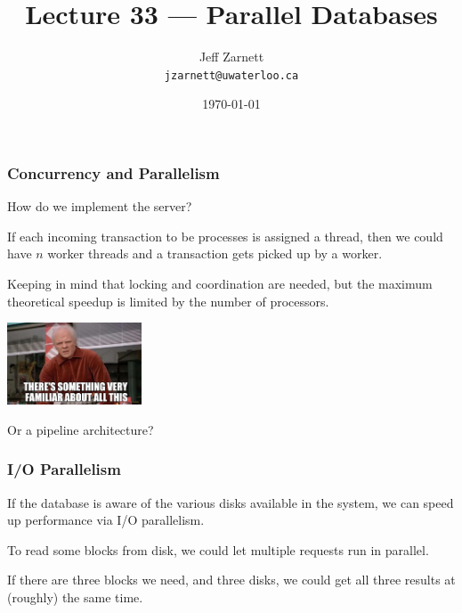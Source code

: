 

\title{Lecture 33 --- Parallel Databases }

\author{Jeff Zarnett \\ \small \texttt{jzarnett@uwaterloo.ca}}
\date{\today}




\begin{frame}
  \titlepage

 \end{frame}
 
 

\begin{frame}
\frametitle{Concurrency and Parallelism}

How do we implement the server?

If each incoming transaction to be processes is assigned a thread, then we could have $n$ worker threads and a transaction gets picked up by a worker. 

Keeping in mind that locking and coordination are needed, but the maximum theoretical speedup is limited by the number of processors.

\begin{center}
	\includegraphics[width=0.3\textwidth]{images/familiar.jpg}
\end{center}


Or a pipeline architecture?
\end{frame}
 
 


\begin{frame}
\frametitle{I/O Parallelism}

If the database is aware of the various disks available in the system, we can speed up performance via I/O parallelism. 

To read some blocks from disk, we could let multiple requests run in parallel. 

If there are three blocks we need, and three disks, we could get all three results at (roughly) the same time. 

\end{frame}


